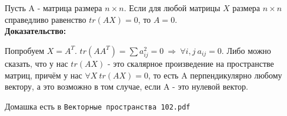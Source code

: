 \documentclass[12pt]{article}
\begin{document}
\begin{theorembox}
    Пусть A - матрица размера $n \times n$. Если для любой матрицы $X$ размера $n \times n$ справедливо равенство $tr(AX) = 0$, то $A = 0$.\\

    \textbf{Доказательство:}

    Попробуем $X = A^T$. $tr(AA^T) = \sum a_{ij}^2 = 0 \ \Rightarrow \ \forall i, j \ a_{ij} = 0$. Либо можно сказать, что у нас $tr(AX)$ - это скалярное произведение на пространстве матриц, причём у нас $\forall X \ tr(AX) = 0$, то есть A перпендикулярно любому вектору, а это возможно в том случае, если A - это нулевой вектор.
    
\end{theorembox}

\begin{homeworkbox}
    Домашка есть в \texttt{Векторные пространства 102.pdf}
\end{homeworkbox}
\end{document}
